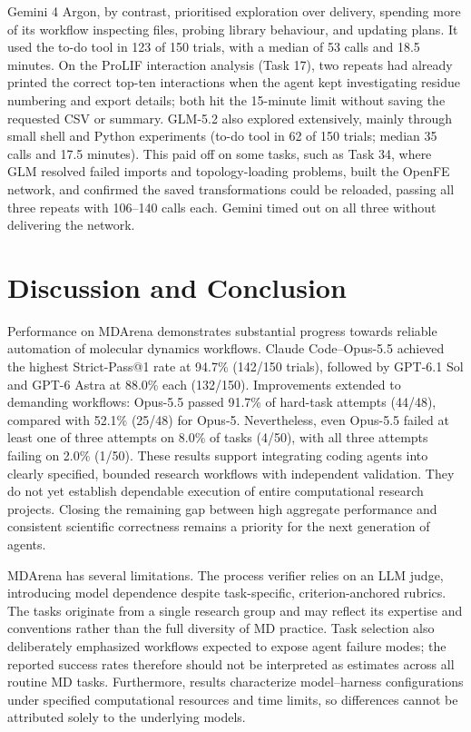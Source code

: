 Gemini 4 Argon, by contrast, prioritised exploration over delivery, spending more of its workflow inspecting files, probing library behaviour, and updating plans. It used the to-do tool in 123 of 150 trials, with a median of 53 calls and 18.5 minutes. On the ProLIF interaction analysis (Task 17), two repeats had already printed the correct top-ten interactions when the agent kept investigating residue numbering and export details; both hit the 15-minute limit without saving the requested CSV or summary. GLM-5.2 also explored extensively, mainly through small shell and Python experiments (to-do tool in 62 of 150 trials; median 35 calls and 17.5 minutes). This paid off on some tasks, such as Task 34, where GLM resolved failed imports and topology-loading problems, built the OpenFE network, and confirmed the saved transformations could be reloaded, passing all three repeats with 106–140 calls each. Gemini timed out on all three without delivering the network.

\section{Discussion and Conclusion}

Performance on MDArena demonstrates substantial progress towards reliable automation of molecular dynamics workflows. Claude Code–Opus-5.5 achieved the highest Strict-Pass@1 rate at 94.7\% (142/150 trials), followed by GPT-6.1 Sol and GPT-6 Astra at 88.0\% each (132/150). Improvements extended to demanding workflows: Opus-5.5 passed 91.7\% of hard-task attempts (44/48), compared with 52.1\% (25/48) for Opus-5. Nevertheless, even Opus-5.5 failed at least one of three attempts on 8.0\% of tasks (4/50), with all three attempts failing on 2.0\% (1/50). These results support integrating coding agents into clearly specified, bounded research workflows with independent validation. They do not yet establish dependable execution of entire computational research projects. Closing the remaining gap between high aggregate performance and consistent scientific correctness remains a priority for the next generation of agents.

MDArena has several limitations. The process verifier relies on an LLM judge, introducing model dependence despite task-specific, criterion-anchored rubrics. The tasks originate from a single research group and may reflect its expertise and conventions rather than the full diversity of MD practice. Task selection also deliberately emphasized workflows expected to expose agent failure modes; the reported success rates therefore should not be interpreted as estimates across all routine MD tasks. Furthermore, results characterize model–harness configurations under specified computational resources and time limits, so differences cannot be attributed solely to the underlying models.


